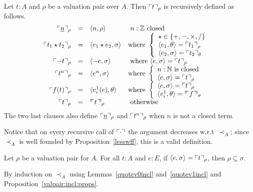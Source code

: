 \documentclass[numreferences]{kluwer}
\newcommand{\Z}{{\mathbb Z}}
\newcommand{\less}{\mathrel{\prec_A}}
\newcommand{\nat}{{\mathbb N}}
\newcommand{\mlfnv}[2]{\ensuremath\ulcorner\!\!\ulcorner{#1}\urcorner\!\!\urcorner_{#2}}
\newcommand{\mlfn}[2]{\ensuremath\ulcorner{#1}\urcorner_{#2}}
\begin{document}
\begin{article}
\begin{definition}\label{defn:quote}
Let $t:A$ and $\rho$ be a valuation pair over $A$.  Then
$\mlfn{t}{\rho}$ is recursively defined as follows.
\[
\begin{array}{rcll}
\mlfn{\underline n}{\rho} & = & \langle n,\rho\rangle
 & \mbox{ $n:\Z$ closed}\\
\mlfn{t_1\star t_2}{\rho} & = & \langle e_1\star e_2,\sigma\rangle
 & \mbox{where }\left\{\begin{array}l \star\in\{+,-,\times,/\}\\
                       \langle e_1,\theta\rangle=\mlfn{t_1}{\rho}\\
                       \langle e_2,\sigma\rangle=\mlfn{t_2}{\theta}
                       \end{array}\right. \\
\mlfn{-t}{\rho} & = & \langle -e,\sigma\rangle
 & \mbox{ where $\langle e,\sigma\rangle=\mlfn{t}{\rho}$}\\
\mlfn{t^n}{\rho} & = & \langle e^n,\sigma\rangle
 & \mbox{where }\left\{\begin{array}l n:\nat\mbox{ is closed}\\
                       \langle e,\sigma\rangle=\mlfn{t}{\rho}
                       \end{array}\right. \\
\mlfn{f(t)}{\rho} & = & \langle v^1_i(e),\theta\rangle
 & \mbox{where }\left\{\begin{array}l \langle e,\sigma\rangle=\mlfn{t}{\rho}\\
                       \langle v^1_i,\theta\rangle=\mlfnv{f}{\sigma}
                       \end{array}\right. \\
\mlfn{t}{\rho} & = & \mlfnv{t}{\rho} & \mbox{ otherwise}
\end{array}
\]
The two last clauses also define $\mlfn{\underline n}{\rho}$ and
$\mlfn{t^n}{\rho}$ when $n$ is not a closed term.

Notice that on every recursive call of $\mlfn{\cdot}{}$ the argument
decreases w.r.t\ $\less$; since $\less$ is well founded by
Proposition~\ref{lesswff}, this is a valid definition.
\end{definition}

\begin{lemma}\label{quoteincl}
Let $\rho$ be a valuation pair for $A$.  For all $t:A$ and $e:E$, if
$\langle e,\sigma\rangle=\mlfn{t}{\rho}$, then $\rho\subseteq\sigma$.
\end{lemma}
\begin{pf} By induction on $\less$ using Lemmas~\ref{quotev0incl}
and~\ref{quotev1incl} and Proposition~\ref{valpair:incl:props}.
\end{pf}


\end{article}
\end{document}

